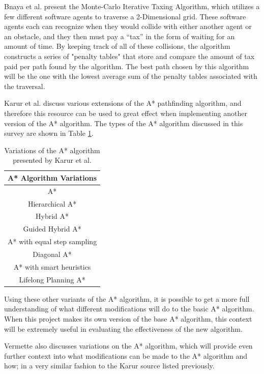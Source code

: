 \par
Bnaya et al. \cite{bnaya2013multi} present the Monte-Carlo Iterative Taxing Algorithm, which utilizes a few different software agents to traverse a 2-Dimensional grid. These software agents each can recognize when they would collide with either another agent or an obstacle, and they then must pay a “tax” in the form of waiting for an amount of time. By keeping track of all of these collisions, the algorithm constructs a series of "penalty tables" that store and compare the amount of tax paid per path found by the algorithm. The best path chosen by this algorithm will be the one with the lowest average sum of the penalty tables associated with the traversal.
\par
Karur et al. \cite{karur2021survey} discuss various extensions of the A* pathfinding algorithm, and therefore this resource can be used to great effect when implementing another version of the A* algorithm. The types of the A* algorithm discussed in this survey are shown in Table \ref{tab:algvariations}.
\begin{table}[H]\centering\footnotesize
    \caption{Variations of the A* algorithm presented by Karur et al.}\label{tab:algvariations}
    \begin{tabular}{|c|}
        \hline
        \textbf{A* Algorithm Variations} \\ \hline
        A* \\ \hline
        Hierarchical A* \\ \hline
        Hybrid A* \\ \hline
        Guided Hybrid A* \\ \hline
        A* with equal step sampling \\ \hline
        Diagonal A* \\ \hline
        A* with smart heuristics \\ \hline
        Lifelong Planning A* \\ \hline
    \end{tabular}
\end{table}
Using these other variants of the A* algorithm, it is possible to get a more full understanding of what different modifications will do to the basic A* algorithm. When this project makes its own version of the base A* algorithm, this context will be extremely useful in evaluating the effectiveness of the new algorithm.
\par
Vermette \cite{vermette2011survey} also discusses variations on the A* algorithm, which will provide even further context into what modifications can be made to the A* algorithm and how; in a very similar fashion to the Karur source listed previously.
